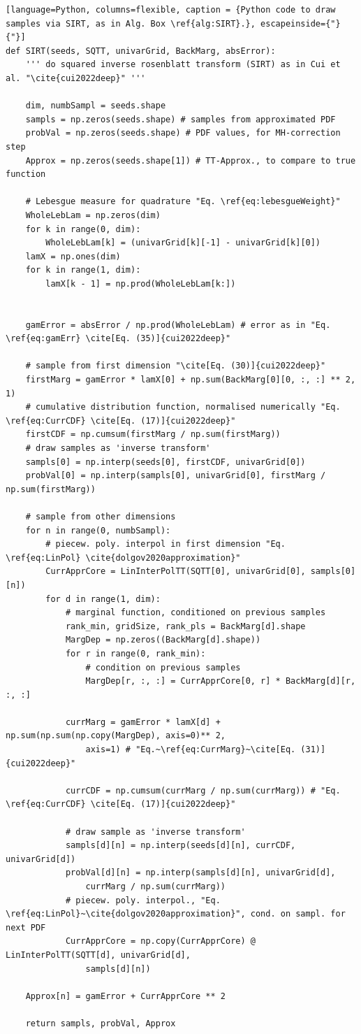 \clearpage
\begin{lstlisting}[language=Python,	columns=flexible, caption = {Python code to draw samples via SIRT, as in Alg. Box \ref{alg:SIRT}.}, escapeinside={"}{"}]
def SIRT(seeds, SQTT, univarGrid, BackMarg, absError):
	''' do squared inverse rosenblatt transform (SIRT) as in Cui et al. "\cite{cui2022deep}" '''
	
	dim, numbSampl = seeds.shape
	sampls = np.zeros(seeds.shape) # samples from approximated PDF
	probVal = np.zeros(seeds.shape) # PDF values, for MH-correction step
	Approx = np.zeros(seeds.shape[1]) # TT-Approx., to compare to true function
	
	# Lebesgue measure for quadrature "Eq. \ref{eq:lebesgueWeight}"
	WholeLebLam = np.zeros(dim)
	for k in range(0, dim):
		WholeLebLam[k] = (univarGrid[k][-1] - univarGrid[k][0])
	lamX = np.ones(dim)
	for k in range(1, dim):
		lamX[k - 1] = np.prod(WholeLebLam[k:])
	
	
	gamError = absError / np.prod(WholeLebLam) # error as in "Eq. \ref{eq:gamErr} \cite[Eq. (35)]{cui2022deep}"
	
	# sample from first dimension "\cite[Eq. (30)]{cui2022deep}"
	firstMarg = gamError * lamX[0] + np.sum(BackMarg[0][0, :, :] ** 2, 1)
	# cumulative distribution function, normalised numerically "Eq. \ref{eq:CurrCDF} \cite[Eq. (17)]{cui2022deep}"
	firstCDF = np.cumsum(firstMarg / np.sum(firstMarg))
	# draw samples as 'inverse transform'
	sampls[0] = np.interp(seeds[0], firstCDF, univarGrid[0])
	probVal[0] = np.interp(sampls[0], univarGrid[0], firstMarg / np.sum(firstMarg))
	
	# sample from other dimensions
	for n in range(0, numbSampl):
		# piecew. poly. interpol in first dimension "Eq. \ref{eq:LinPol} \cite{dolgov2020approximation}"
		CurrApprCore = LinInterPolTT(SQTT[0], univarGrid[0], sampls[0][n])
		for d in range(1, dim):
			# marginal function, conditioned on previous samples
			rank_min, gridSize, rank_pls = BackMarg[d].shape
			MargDep = np.zeros((BackMarg[d].shape))
			for r in range(0, rank_min):
				# condition on previous samples
				MargDep[r, :, :] = CurrApprCore[0, r] * BackMarg[d][r, :, :]
			
			currMarg = gamError * lamX[d] + np.sum(np.sum(np.copy(MargDep), axis=0)** 2,
				axis=1) # "Eq.~\ref{eq:CurrMarg}~\cite[Eq. (31)]{cui2022deep}"
			
			currCDF = np.cumsum(currMarg / np.sum(currMarg)) # "Eq. \ref{eq:CurrCDF} \cite[Eq. (17)]{cui2022deep}"
			
			# draw sample as 'inverse transform'
			sampls[d][n] = np.interp(seeds[d][n], currCDF, univarGrid[d])
			probVal[d][n] = np.interp(sampls[d][n], univarGrid[d],  
				currMarg / np.sum(currMarg))
			# piecew. poly. interpol., "Eq. \ref{eq:LinPol}~\cite{dolgov2020approximation}", cond. on sampl. for next PDF
			CurrApprCore = np.copy(CurrApprCore) @ LinInterPolTT(SQTT[d], univarGrid[d], 
				sampls[d][n]) 
	
	Approx[n] = gamError + CurrApprCore ** 2
	
	return sampls, probVal, Approx
\end{lstlisting}
\clearpage



